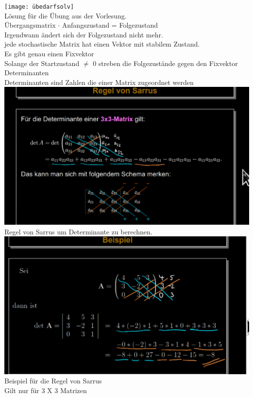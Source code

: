 \documentclass{article}
\begin{document}
	\texttt{[image: übedarfsolv]} \\
	Lösung für die Übung aus der Vorlesung. \\
	Übergangsmatrix $\cdot$ Anfangszustand = Folgezustand \\
	Irgendwann ändert sich der Folgezustand nicht mehr. \\
	jede stochastische Matrix hat einen Vektor mit stabilem Zustand. \\
	Es gibt genau einen Fixvektor \\
	Solange der Startzustand $\neq$ 0 streben die Folgezustände gegen den Fixvektor \\
	Determinanten \\
	Determinanten sind Zahlen die einer Matrix zugeordnet werden \\
	\includegraphics[width=\linewidth]{sarrus}\\
	Regel von Sarrus um Determinante zu berechnen. \\
	\includegraphics[width=\linewidth]{bsarrus} \\
	Beispiel für die Regel von Sarrus \\
	Gilt nur für 3 X 3 Matrizen \\
\end{document}
